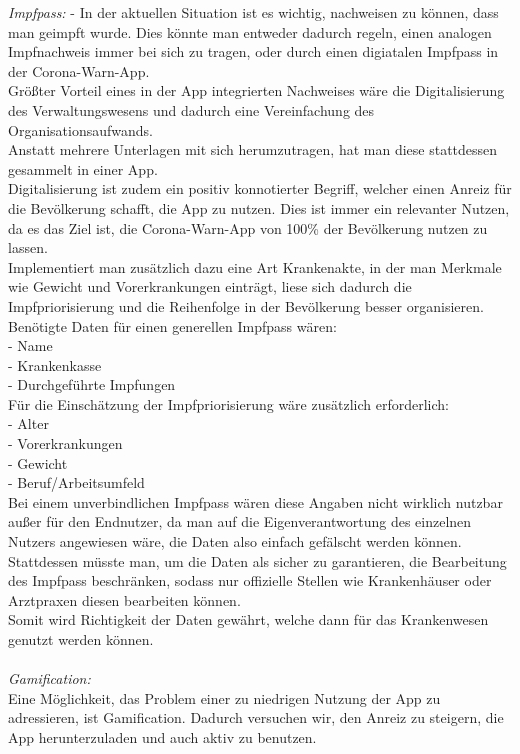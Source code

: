 \documentclass[conference]{IEEEtran}
\begin{document}
\textit{Impfpass:} - In der aktuellen Situation ist es wichtig, nachweisen zu können, dass man geimpft wurde. Dies könnte man entweder dadurch regeln, einen analogen Impfnachweis immer bei sich zu tragen, oder durch einen digiatalen Impfpass in der Corona-Warn-App.\\
Größter Vorteil eines in der App integrierten Nachweises wäre die Digitalisierung des Verwaltungswesens und dadurch eine Vereinfachung des Organisationsaufwands.\\ Anstatt mehrere Unterlagen mit sich herumzutragen, hat man diese stattdessen gesammelt in einer App.\\
Digitalisierung ist zudem ein positiv konnotierter Begriff, welcher einen Anreiz für die Bevölkerung schafft, die App zu nutzen. Dies ist immer ein relevanter Nutzen, da es das Ziel ist, die Corona-Warn-App von 100\% der Bevölkerung nutzen zu lassen. \\
Implementiert man zusätzlich dazu eine Art Krankenakte, in der man Merkmale wie Gewicht und Vorerkrankungen einträgt, liese sich dadurch die Impfpriorisierung und die Reihenfolge in der Bevölkerung besser organisieren.\\
Benötigte Daten für einen generellen Impfpass wären:\\
- Name \\
- Krankenkasse\\
- Durchgeführte Impfungen\\
Für die Einschätzung der Impfpriorisierung wäre zusätzlich erforderlich:\\
- Alter\\
- Vorerkrankungen \\
- Gewicht \\
- Beruf/Arbeitsumfeld\\
Bei einem unverbindlichen Impfpass wären diese Angaben nicht wirklich nutzbar außer für den Endnutzer, da man auf die Eigenverantwortung des einzelnen Nutzers angewiesen wäre, die Daten also einfach gefälscht werden können.\\
Stattdessen müsste man, um die Daten als sicher zu garantieren, die Bearbeitung des Impfpass beschränken, sodass nur offizielle Stellen wie Krankenhäuser oder Arztpraxen diesen bearbeiten können.\\
Somit wird Richtigkeit der Daten gewährt, welche dann für das Krankenwesen genutzt werden können.\\ \\
\textit{Gamification:}\\
Eine Möglichkeit, das Problem einer zu niedrigen Nutzung der App zu adressieren, ist Gamification. Dadurch versuchen wir, den Anreiz zu steigern, die App herunterzuladen und auch aktiv zu benutzen.\\ 
\end{document}
